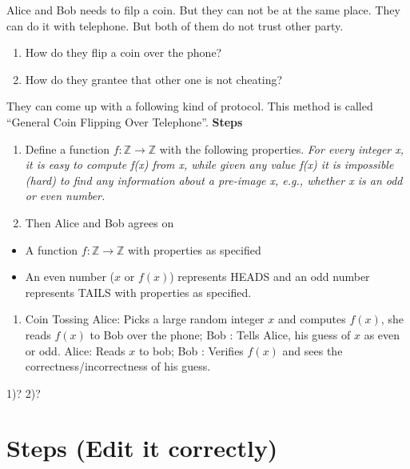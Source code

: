 \documentclass[
]{book}
\providecommand{\tightlist}{%
  \setlength{\itemsep}{0pt}\setlength{\parskip}{0pt}}
\begin{document}
Alice and Bob needs to filp a coin. But they can not be at the same place. They can do it with telephone. But both of them do not trust other party.

\begin{enumerate}
\def\labelenumi{\arabic{enumi}.}
\item
  How do they flip a coin over the phone?
\item
  How do they grantee that other one is not cheating?
\end{enumerate}

They can come up with a following kind of protocol. This method is called ``General Coin Flipping Over Telephone''. \textbf{Steps}

\begin{enumerate}
\def\labelenumi{\arabic{enumi}.}
\tightlist
\item
  Define a function \(f:\mathbb{Z}\rightarrow \mathbb{Z}\) with the following properties.
  \emph{For every integer x, it is easy to compute f(x) from x, while given any value f(x) it is impossible (hard) to find any information about a pre-image x, e.g., whether x is an odd or even number.}
\item
  Then Alice and Bob agrees on
\end{enumerate}

\begin{itemize}
\tightlist
\item
  A function \(f:\mathbb{Z}\rightarrow \mathbb{Z}\) with properties as specified
\item
  An even number (\(x\) or \(f(x)\)) represents HEADS and an odd number represents TAILS with properties as specified.
\end{itemize}

\begin{enumerate}
\def\labelenumi{\arabic{enumi}.}
\setcounter{enumi}{2}
\tightlist
\item
  Coin Tossing
  Alice: Picks a large random integer \(x\) and computes \(f(x)\), she reads \(f(x)\) to Bob over the phone;
  Bob : Tells Alice, his guess of \(x\) as even or odd.
  Alice: Reads \(x\) to bob;
  Bob : Verifies \(f(x)\) and sees the correctness/incorrectness of his guess.
\end{enumerate}

1)?
2)?

\hypertarget{steps-edit-it-correctly}{%
\section{Steps (Edit it correctly)}\label{steps-edit-it-correctly}}
\end{document}
